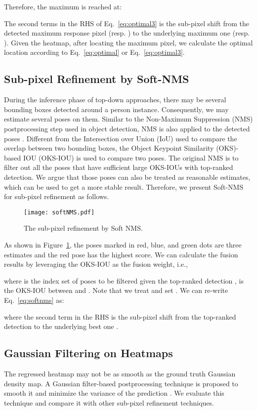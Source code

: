 \documentclass[twocolumn]{svjour3}          \smartqed  \usepackage{natbib}
\begin{document}
Therefore, the maximum  is reached at:

The second terms in the RHS of Eq.~\eqref{eq:optimal3} is the sub-pixel shift from the detected maximum response pixel  (resp. ) to the underlying maximum one  (resp. ). Given the heatmap, after locating the maximum pixel, we calculate the optimal location according to Eq.~\eqref{eq:optimal} or Eq.~\eqref{eq:optimal3}.

\subsection{Sub-pixel Refinement by Soft-NMS}
\label{subsec:softnms}

During the inference phase of top-down approaches, there may be several bounding boxes detected around a person instance. Consequently, we may estimate several poses on them. Similar to the Non-Maximum Suppression (NMS) postprocessing step used in object detection, NMS is also applied to the detected poses \citep{chen2018cascaded,xiao2018simple,sun2019deep}. Different from the Intersection over Union (IoU) used to compare the overlap between two bounding boxes, the Object Keypoint Similarity (OKS)-based IOU (OKS-IOU) is used to compare two poses. The original NMS is to filter out all the poses that have sufficient large OKS-IOUs with top-ranked detection. We argue that those poses can also be treated as reasonable estimates, which can be used to get a more stable result. Therefore, we present Soft-NMS for sub-pixel refinement as follows.

\begin{figure}[t]
\centering
\texttt{[image: softNMS.pdf]}
\caption{The sub-pixel refinement by Soft NMS.}
\label{fig:softnms}
\end{figure}

As shown in Figure~\ref{fig:softnms}, the poses marked in red, blue, and green dots are three estimates and the red pose has the highest score. We can calculate the fusion results by leveraging the OKS-IOU as the fusion weight, i.e.,

where  is the index set of poses to be filtered given the top-ranked detection ,  is the OKS-IOU between  and . Note that we treat  and set . We can re-write Eq.~\eqref{eq:softnms} as:

where the second term in the RHS is the sub-pixel shift from the top-ranked detection  to the underlying best one .


\subsection{Gaussian Filtering on Heatmaps}
\label{subsec:gb}
The regressed heatmap may not be as smooth as the ground truth Gaussian density map. A Gaussian filter-based postprocessing technique is proposed to smooth it and minimize the variance of the prediction \citep{chen2018cascaded,li2019rethinking}. We evaluate this technique and compare it with other sub-pixel refinement techniques.
\end{document}
